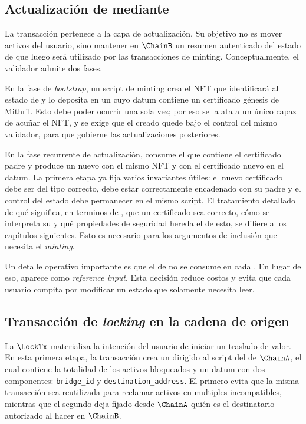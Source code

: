 \subsection{Actualización de \StakeDistribution mediante \texorpdfstring{\StakeDistTx}{tx\_sd}}

La transacción \StakeDistTx pertenece a la capa de actualización. Su objetivo no es mover activos del usuario, sino mantener en $\ChainB$ un resumen autenticado del estado de \Mithril que luego será utilizado por las transacciones de minting. Conceptualmente, el validador admite dos fases.

En la fase de \textit{bootstrap}, un script de minting crea el NFT que identificará al estado de \StakeDistribution y lo deposita en un \UTxO cuyo datum contiene un certificado génesis de Mithril. Esto debe poder ocurrir una sola vez; por eso se la ata a un único \UTxO capaz de acuñar el NFT, y se exige que el \UTxO creado quede bajo el control del mismo validador, para que gobierne las actualizaciones posteriores.

En la fase recurrente de actualización, \StakeDistTx consume el \UTxO que contiene el certificado padre y produce un nuevo \UTxO con el mismo NFT y con el certificado nuevo en el datum. La primera etapa ya fija varios invariantes útiles: el nuevo certificado debe ser del tipo correcto, debe estar correctamente encadenado con su padre y el control del estado debe permanecer en el mismo script. El tratamiento detallado de qué significa, en terminos de \Mithril, que un certificado sea correcto, cómo se interpreta su \CertificateChain y qué propiedades de seguridad hereda el \zkBridge de esto, se difiere a los capítulos siguientes. Esto es necesario para los argumentos de inclusión que necesita el \textit{minting}.

Un detalle operativo importante es que el \UTxO de \StakeDistribution no se consume en cada \MintTx. En lugar de eso, aparece como \textit{reference input}. Esta decisión reduce costos y evita que cada usuario compita por modificar un estado que solamente necesita leer.

\subsection{Transacción de \textit{locking} en la cadena de origen}

La $\LockTx$ materializa la intención del usuario de iniciar un traslado de valor. En esta primera etapa, la transacción crea un \UTxO dirigido al script del \UnlockingValidator de $\ChainA$, el cual contiene la totalidad de los activos bloqueados y un datum con dos componentes: \texttt{bridge\_id} y \texttt{destination\_address}. El primero evita que la misma transacción sea reutilizada para reclamar activos en multiples \Bridges incompatibles, mientras que el segundo deja fijado desde $\ChainA$ quién es el destinatario autorizado al hacer \MintTx en $\ChainB$.

